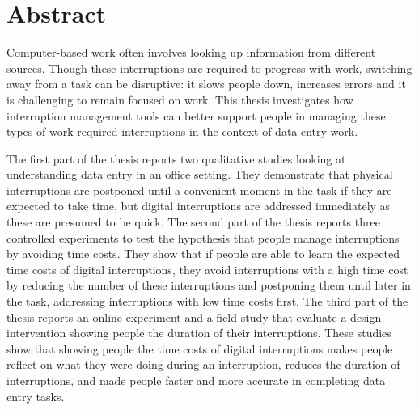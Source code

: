 \section*{Abstract}
Computer-based work often involves looking up information from different sources. Though these interruptions are required to progress with work, switching away from a task can be disruptive: it slows people down, increases errors and it is challenging to remain focused on work. This thesis investigates how interruption management tools can better support people in managing these types of work-required interruptions in the context of data entry work.

The first part of the thesis reports two qualitative studies looking at understanding data entry in an office setting. They demonstrate that physical interruptions are postponed until a convenient moment in the task if they are expected to take time, but digital interruptions are addressed immediately as these are presumed to be quick. The second part of the thesis reports three controlled experiments to test the hypothesis that people manage interruptions by avoiding time costs. They show that if people are able to learn the expected time costs of digital interruptions, they avoid interruptions with a high time cost by reducing the number of these interruptions and postponing them until later in the task, addressing interruptions with low time costs first. The third part of the thesis reports an online experiment and a field study that evaluate a design intervention showing people the duration of their interruptions. These studies show that showing people the time costs of digital interruptions makes people reflect on what they were doing during an interruption, reduces the duration of interruptions, and made people faster and more accurate in completing data entry tasks.


